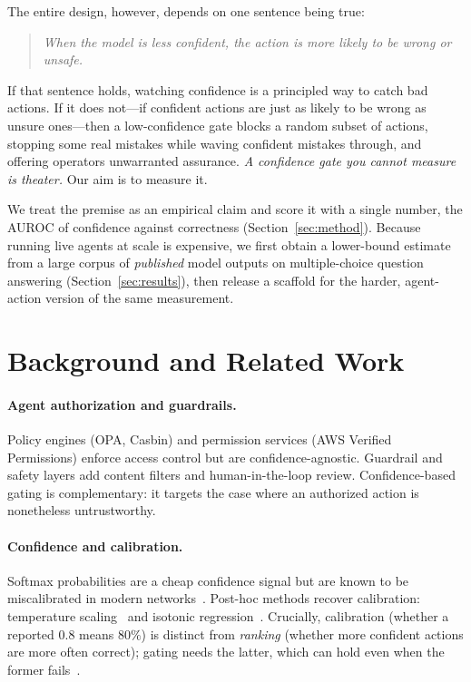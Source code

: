 \documentclass[10pt,twocolumn]{article}
\begin{document}
The entire design, however, depends on one sentence being true:
\begin{quote}
\emph{When the model is less confident, the action is more likely to be wrong or
unsafe.}
\end{quote}
If that sentence holds, watching confidence is a principled way to catch bad
actions. If it does not---if confident actions are just as likely to be wrong as
unsure ones---then a low-confidence gate blocks a random subset of actions,
stopping some real mistakes while waving confident mistakes through, and offering
operators unwarranted assurance. \emph{A confidence gate you cannot measure is
theater.} Our aim is to measure it.

We treat the premise as an empirical claim and score it with a single number, the
AUROC of confidence against correctness (Section~\ref{sec:method}). Because
running live agents at scale is expensive, we first obtain a lower-bound estimate
from a large corpus of \emph{published} model outputs on multiple-choice question
answering (Section~\ref{sec:results}), then release a scaffold for the harder,
agent-action version of the same measurement.

\section{Background and Related Work}
\paragraph{Agent authorization and guardrails.}
Policy engines (OPA, Casbin) and permission services (AWS Verified Permissions)
enforce access control but are confidence-agnostic. Guardrail and safety layers
add content filters and human-in-the-loop review. Confidence-based gating is
complementary: it targets the case where an authorized action is nonetheless
untrustworthy.

\paragraph{Confidence and calibration.}
Softmax probabilities are a cheap confidence signal but are known to be
miscalibrated in modern networks~\cite{guo2017calibration}. Post-hoc methods
recover calibration: temperature scaling~\cite{guo2017calibration} and isotonic
regression~\cite{niculescu2005predicting}. Crucially, calibration (whether a
reported $0.8$ means $80\%$) is distinct from \emph{ranking} (whether more
confident actions are more often correct); gating needs the latter, which can
hold even when the former fails~\cite{plaut2025probabilities}.
\end{document}
